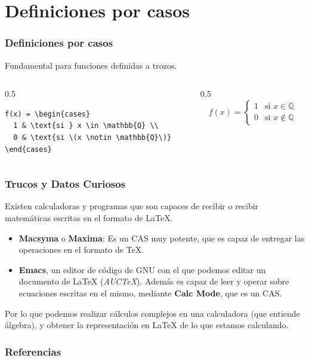 \documentclass[12pt,aspectratio=169,ignorenonframetext]{ltxbeamer}
\begin{document}
\section{Definiciones por casos}
\begin{frame}[fragile]
\frametitle{Definiciones por casos}
Fundamental para funciones definidas a trozos.

\begin{columns}
    \begin{column}{0.5\textwidth}
        \begin{verbatim}
f(x) = \begin{cases}
  1 & \text{si } x \in \mathbb{Q} \\
  0 & \text{si \(x \notin \mathbb{Q}\)}
\end{cases}
        \end{verbatim}
    \end{column}

    \begin{column}{0.5\textwidth}
        \begin{displaymath}
            f(x) = \begin{cases}
                1 & \text{si } x \in \mathbb{Q} \\
                0 & \text{si  \(x \notin \mathbb{Q}\)}
            \end{cases}
        \end{displaymath}
    \end{column}
\end{columns}
\end{frame}





\begin{frame}
\frametitle{Trucos y Datos Curiosos}

Existen calculadoras y programas que son capaces de recibir o recibir matemáticas escritas en el formato de {\lmr\LaTeX}.

\begin{itemize}[<+->]
    \item \alert<1>{\bf Macsyma} o \alert<1>{\bf Maxima}: Es un CAS muy potente, que es capaz de entregar las operaciones en el formato de {\lmr\TeX}.
    \item \alert<2-3>{\bf Emacs}, un editor de código de GNU con el que podemos editar un documento de {\lmr\LaTeX} (\emph{\lmr AUC\TeX}). Además es capaz de leer y operar sobre ecuaciones escritas en el mismo, mediante \alert<3>{\bf Calc Mode}, que es un CAS.
\end{itemize}

\pause

Por lo que podemos realizar cálculos complejos en una calculadora (que entiende álgebra), y obtener la representación en {\lmr\LaTeX} de lo que estamos calculando.
\end{frame}





\begin{frame}[allowframebreaks]
\frametitle{Referencias}
\nocite{*}
\printbibliography
\end{frame}
\end{document}

